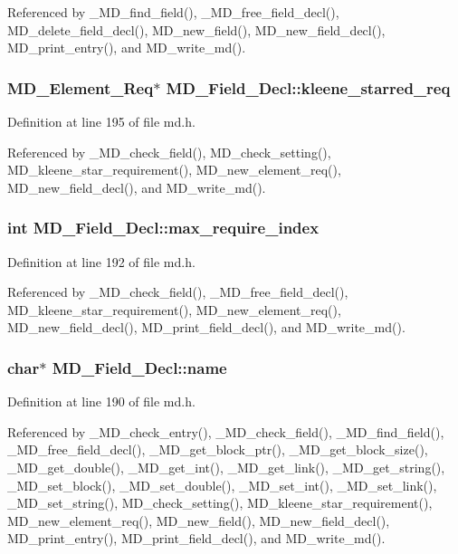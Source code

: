 Referenced by \_\-MD\_\-find\_\-field(), \_\-MD\_\-free\_\-field\_\-decl(), MD\_\-delete\_\-field\_\-decl(), MD\_\-new\_\-field(), MD\_\-new\_\-field\_\-decl(), MD\_\-print\_\-entry(), and MD\_\-write\_\-md().
\subsubsection{\setlength{\rightskip}{0pt plus 5cm}\bf{MD\_\-Element\_\-Req}$\ast$ \bf{MD\_\-Field\_\-Decl::kleene\_\-starred\_\-req}}\label{structMD__Field__Decl_c2dff0726ae0fa2813377e968ca3dfab}




Definition at line 195 of file md.h.

Referenced by \_\-MD\_\-check\_\-field(), MD\_\-check\_\-setting(), MD\_\-kleene\_\-star\_\-requirement(), MD\_\-new\_\-element\_\-req(), MD\_\-new\_\-field\_\-decl(), and MD\_\-write\_\-md().
\subsubsection{\setlength{\rightskip}{0pt plus 5cm}int \bf{MD\_\-Field\_\-Decl::max\_\-require\_\-index}}\label{structMD__Field__Decl_9fd199750f1a1bbc166743145d20af20}




Definition at line 192 of file md.h.

Referenced by \_\-MD\_\-check\_\-field(), \_\-MD\_\-free\_\-field\_\-decl(), MD\_\-kleene\_\-star\_\-requirement(), MD\_\-new\_\-element\_\-req(), MD\_\-new\_\-field\_\-decl(), MD\_\-print\_\-field\_\-decl(), and MD\_\-write\_\-md().
\subsubsection{\setlength{\rightskip}{0pt plus 5cm}char$\ast$ \bf{MD\_\-Field\_\-Decl::name}}\label{structMD__Field__Decl_fe0600b3a01ca8478f4f1055459d7e45}




Definition at line 190 of file md.h.

Referenced by \_\-MD\_\-check\_\-entry(), \_\-MD\_\-check\_\-field(), \_\-MD\_\-find\_\-field(), \_\-MD\_\-free\_\-field\_\-decl(), \_\-MD\_\-get\_\-block\_\-ptr(), \_\-MD\_\-get\_\-block\_\-size(), \_\-MD\_\-get\_\-double(), \_\-MD\_\-get\_\-int(), \_\-MD\_\-get\_\-link(), \_\-MD\_\-get\_\-string(), \_\-MD\_\-set\_\-block(), \_\-MD\_\-set\_\-double(), \_\-MD\_\-set\_\-int(), \_\-MD\_\-set\_\-link(), \_\-MD\_\-set\_\-string(), MD\_\-check\_\-setting(), MD\_\-kleene\_\-star\_\-requirement(), MD\_\-new\_\-element\_\-req(), MD\_\-new\_\-field(), MD\_\-new\_\-field\_\-decl(), MD\_\-print\_\-entry(), MD\_\-print\_\-field\_\-decl(), and MD\_\-write\_\-md().
